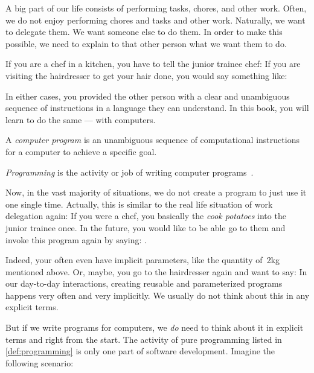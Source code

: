 %
A big part of our life consists of performing tasks, chores, and other work.
Often, we do not enjoy performing chores and tasks and other work.
Naturally, we want to delegate them.
We want someone else to do them.
In order to make this possible, we need to explain to that other person what we want them to do.

If you are a chef in a kitchen, you have to tell the junior trainee chef:
If you are visiting the hairdresser to get your hair done, you would say something like:

In either cases, you provided the other person with a clear and unambiguous sequence of instructions in a language they can understand.
In this book, you will learn to do the same --- with computers.
%
\begin{definition}%
A \emph{computer program} is an unambiguous sequence of computational instructions for a computer to achieve a specific goal.%
\end{definition}%
\begin{definition}[Programming]%
\label{def:programming}
\emph{Programming} is the activity or job of writing computer programs~\cite{CDE2024PMOPIE}.%
\end{definition}%
%
Now, in the vast majority of situations, we do not create a program to just use it one single time.
Actually, this is similar to the real life situation of work delegation again:
If you were a chef, you basically  the  \emph{cook potatoes} into the junior trainee once.
In the future, you would like to be able go to them and invoke this program again by saying:
.

Indeed, your  often even have implicit parameters, like the quantity of~2kg mentioned above.
Or, maybe, you go to the hairdresser again and want to say: 
In our day-to-day interactions, creating reusable and parameterized programs happens very often and very implicitly.
We usually do not think about this in any explicit terms.

But if we write programs for computers, we \emph{do} need to think about it in explicit terms and right from the start.
The activity of pure programming listed in \cref{def:programming} is only one part of software development.
Imagine the following scenario:

